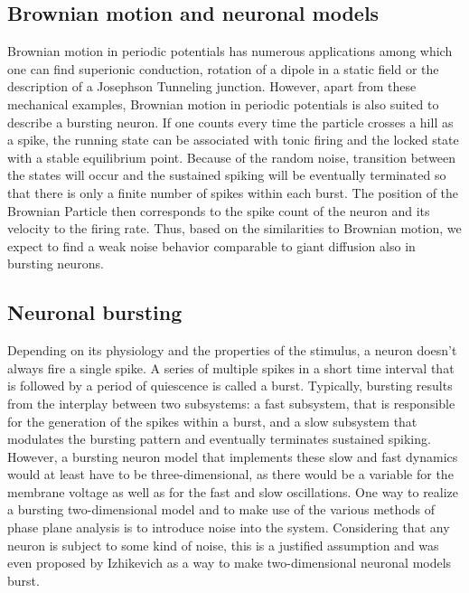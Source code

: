 \documentclass[12pt,a4paper]{article}
\begin{document}
\subsection{Brownian motion and neuronal models}
Brownian motion in periodic potentials has numerous applications among which one can find superionic conduction, rotation of a dipole in a static field or the description of a Josephson Tunneling junction\cite{fpe}. However, apart from these mechanical examples, Brownian motion in periodic potentials is also suited to describe a bursting neuron. If one counts every time the particle crosses a hill as a spike, the running state can be associated with tonic firing and the locked state with a stable equilibrium point. Because of the random noise, transition between the states will occur and the sustained spiking will be eventually terminated so that there is only a finite number of spikes within each burst. The position of the Brownian Particle then corresponds to the spike count of the neuron and its velocity to the firing rate. Thus, based on the similarities to Brownian motion, we expect to find a weak noise behavior comparable to giant diffusion also in bursting neurons.
\subsection{Neuronal bursting}
Depending on its physiology and the properties of the stimulus, a neuron doesn't always fire a single spike. A series of multiple spikes in a short time interval that is followed by a period of quiescence is called a burst\cite{izi}. Typically, bursting results from the interplay between two subsystems: a fast subsystem, that is responsible for the generation of the spikes within a burst, and a slow subsystem that modulates the bursting pattern and eventually terminates sustained spiking. However, a bursting neuron model that implements these slow and fast dynamics would at least have to be three-dimensional, as there would be a variable for the membrane voltage as well as for the fast and slow oscillations. One way to realize a bursting two-dimensional model and to make use of the various methods of phase plane analysis is to introduce noise into the system. Considering that any neuron is subject to some kind of noise, this is a justified assumption and was even proposed by Izhikevich as a way to make two-dimensional neuronal models burst\cite{izi}.
\end{document}
